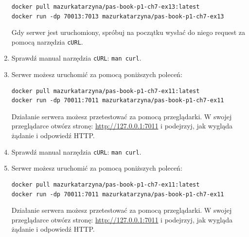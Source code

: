 \begin{enumerate}[label=\textbf{7.\arabic*}]
\begin{verbatim}
docker pull mazurkatarzyna/pas-book-p1-ch7-ex13:latest
docker run -dp 70013:7013 mazurkatarzyna/pas-book-p1-ch7-ex13
\end{verbatim}

\noindent Gdy serwer jest uruchomiony, spróbuj na początku wysłać do niego request za pomocą narzędzia \texttt{cURL}. 
\item Sprawdź manual narzędzia \texttt{cURL}: \texttt{man curl}.
\item Serwer możesz uruchomić za pomocą poniższych poleceń:

\begin{verbatim}
docker pull mazurkatarzyna/pas-book-p1-ch7-ex11:latest
docker run -dp 70011:7011 mazurkatarzyna/pas-book-p1-ch7-ex11
\end{verbatim}

\noindent Działanie serwera możesz przetestować za pomocą przeglądarki. W swojej przeglądarce otwórz stronę: \url{http://127.0.0.1:7011} i podejrzyj, jak wygląda żądanie i odpowiedź HTTP.
\item Sprawdź manual narzędzia \texttt{cURL}: \texttt{man curl}.
\item Serwer możesz uruchomić za pomocą poniższych poleceń:

\begin{verbatim}
docker pull mazurkatarzyna/pas-book-p1-ch7-ex11:latest
docker run -dp 70011:7011 mazurkatarzyna/pas-book-p1-ch7-ex11
\end{verbatim}

\noindent Działanie serwera możesz przetestować za pomocą przeglądarki. W swojej przeglądarce otwórz stronę: \url{http://127.0.0.1:7011} i podejrzyj, jak wygląda żądanie i odpowiedź HTTP. \\


\end{enumerate}
